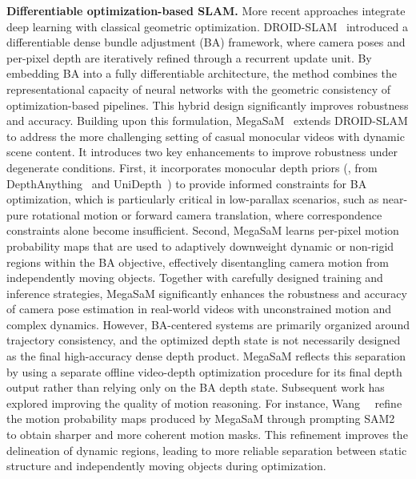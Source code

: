 \noindent\textbf{Differentiable optimization-based SLAM.} More recent approaches integrate deep learning with classical geometric optimization.
DROID-SLAM~\cite{teed2021droid} introduced a differentiable dense bundle adjustment (BA) framework, where camera poses and per-pixel depth are iteratively refined through a recurrent update unit.
By embedding BA into a fully differentiable architecture, the method combines the representational capacity of neural networks with the geometric consistency of optimization-based pipelines.
This hybrid design significantly improves robustness and accuracy. %
Building upon this formulation, MegaSaM~\cite{li2025megasam} extends DROID-SLAM to address the more challenging setting of casual monocular videos with dynamic scene content.
It introduces two key enhancements to improve robustness under degenerate conditions.
First, it incorporates monocular depth priors (\ie, from DepthAnything~\cite{yang2024depth} and UniDepth~\cite{piccinelli2024unidepth}) to provide informed constraints for BA optimization, which is particularly critical in low-parallax scenarios, such as near-pure rotational motion or forward camera translation, where correspondence constraints alone become insufficient.
Second, MegaSaM learns per-pixel motion probability maps that are used to adaptively downweight dynamic or non-rigid regions within the BA objective, effectively disentangling camera motion from independently moving objects.
Together with carefully designed training and inference strategies, MegaSaM significantly enhances the robustness and accuracy of camera pose estimation in real-world videos with unconstrained motion and complex dynamics.
However, BA-centered systems are primarily organized around trajectory consistency, and the optimized depth state is not necessarily designed as the final high-accuracy dense depth product.
MegaSaM reflects this separation by using a separate offline video-depth optimization procedure for its final depth output rather than relying only on the BA depth state.
Subsequent work has explored improving the quality of motion reasoning. 
For instance, Wang~\etal~\cite{wang2025spatialvid} refine the motion probability maps produced by MegaSaM through prompting SAM2~\cite{ravi2025sam} to obtain sharper and more coherent motion masks.
This refinement improves the delineation of dynamic regions, leading to more reliable separation between static structure and independently moving objects during optimization.

